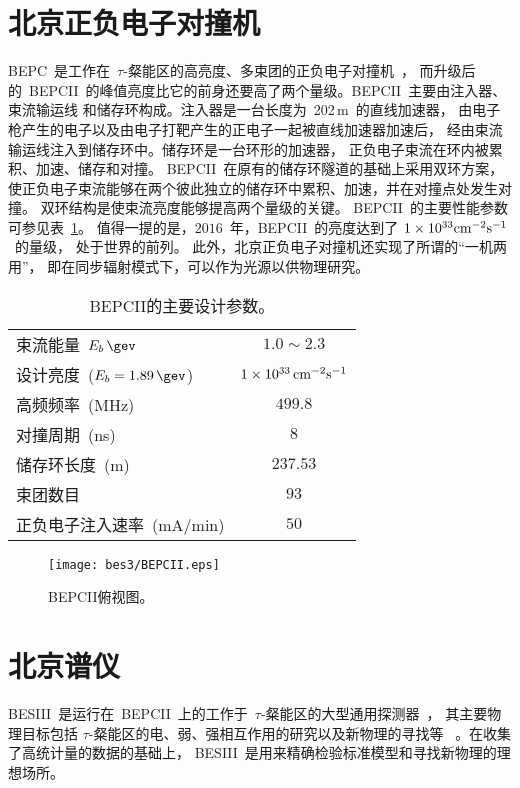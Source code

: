 \section{北京正负电子对撞机}
BEPC~是工作在~$\tau$-粲能区的高亮度、多束团的正负电子对撞机~\cite{BEPCII}，
而升级后的~BEPCII~的峰值亮度比它的前身还要高了两个量级。BEPCII~主要由注入器、束流输运线
和储存环构成。注入器是一台长度为~202\,m~的直线加速器，
由电子枪产生的电子以及由电子打靶产生的正电子一起被直线加速器加速后，
经由束流输运线注入到储存环中。储存环是一台环形的加速器，
正负电子束流在环内被累积、加速、储存和对撞。
BEPCII~在原有的储存环隧道的基础上采用双环方案，
使正负电子束流能够在两个彼此独立的储存环中累积、加速，并在对撞点处发生对撞。
双环结构是使束流亮度能够提高两个量级的关键\cite{BESIII-design}。
BEPCII~的主要性能参数可参见表~\ref{tab:BEPCII}。
值得一提的是，$2016$~年，BEPCII~的亮度达到了
$1 \times 10^{33} {\rm cm}^{-2} {\rm s}^{-1}$~的量级，
处于世界的前列。
此外，北京正负电子对撞机还实现了所谓的“一机两用”，
即在同步辐射模式下，可以作为光源以供物理研究。
\begin{table}
    \centering
    \small
    \setlength{\abovecaptionskip}{0pt}
    \setlength{\belowcaptionskip}{5pt}
    \caption{BEPCII的主要设计参数。}%
    \label{tab:BEPCII}
    \begin{tabular}{lc}
        \toprule
        束流能量~$E_{b}\,\gev$        & $1.0\sim2.3$  \\
        设计亮度~($E_{b}=1.89\,\gev$) & $1 \times 10^{33}\,{\rm cm}^{-2}{\rm s}^{-1}$ \\
    高频频率~(MHz)                & $499.8$ \\
    对撞周期~(ns)                 & $8$ \\
    储存环长度~(m)                & $237.53$ \\
    束团数目                      & $93$ \\
    正负电子注入速率~(mA/min)     & $50$ \\
    \bottomrule
\end{tabular}%
\end{table}

\begin{figure}
    \centering
    \texttt{[image: bes3/BEPCII.eps]}
    \caption{BEPCII俯视图。}%
    \label{fig:BEPCII}
\end{figure}

\section{北京谱仪}
BESIII~是运行在~BEPCII~上的工作于~$\tau$-粲能区的大型通用探测器~\cite{bes3}，
其主要物理目标包括 $\tau$-粲能区的电、弱、强相互作用的研究以及新物理的寻找等
~\cite{bes3phys}。在收集了高统计量的数据的基础上，
BESIII~是用来精确检验标准模型和寻找新物理的理想场所。

